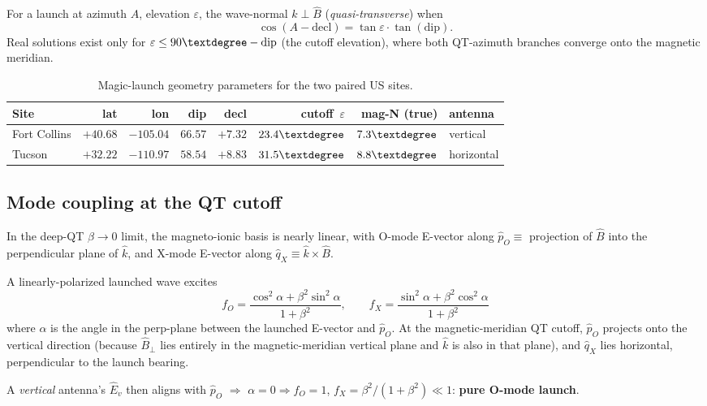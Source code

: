 \documentclass[11pt]{article}
\begin{document}
For a launch at azimuth $A$, elevation $\varepsilon$, the wave-normal
$\hat{k}\!\perp\!\hat{B}$ (\emph{quasi-transverse}) when
\[
   \cos(A - \mathrm{decl}) = \tan\varepsilon\cdot\tan(\mathrm{dip}).
\]
Real solutions exist only for $\varepsilon\le 90\textdegree-\mathrm{dip}$
(the cutoff elevation), where both QT-azimuth branches converge onto
the magnetic meridian.

\begin{table}[H]
\centering
\caption{Magic-launch geometry parameters for the two paired US sites.}
\begin{tabular}{lrrrrrrl}
\toprule
Site            & lat        & lon         & dip   & decl   & cutoff~$\varepsilon$ & mag-N (true) & antenna \\
\midrule
Fort Collins    & $+40.68$   & $-105.04$   & $66.57$ & $+7.32$ & $23.4\textdegree$ & $7.3\textdegree$  & vertical \\
Tucson          & $+32.22$   & $-110.97$   & $58.54$ & $+8.83$ & $31.5\textdegree$ & $8.8\textdegree$  & horizontal \\
\bottomrule
\end{tabular}
\end{table}

\subsection*{Mode coupling at the QT cutoff}

In the deep-QT $\beta\!\to\!0$ limit, the magneto-ionic basis is
nearly linear, with O-mode E-vector along $\hat{p}_O\equiv$ projection
of $\hat{B}$ into the perpendicular plane of $\hat{k}$, and X-mode
E-vector along $\hat{q}_X\equiv\hat{k}\!\times\!\hat{B}$.

A linearly-polarized launched wave excites
\[
   f_O = \frac{\cos^2\alpha + \beta^2\sin^2\alpha}{1+\beta^2}, \qquad
   f_X = \frac{\sin^2\alpha + \beta^2\cos^2\alpha}{1+\beta^2}
\]
where $\alpha$ is the angle in the perp-plane between the launched
E-vector and $\hat{p}_O$.  At the magnetic-meridian QT cutoff,
$\hat{p}_O$ projects onto the vertical direction (because $\hat{B}_\perp$
lies entirely in the magnetic-meridian vertical plane and $\hat{k}$
is also in that plane), and $\hat{q}_X$ lies horizontal,
perpendicular to the launch bearing.

A \emph{vertical} antenna's $\hat{E}_v$ then aligns with $\hat{p}_O$
$\Rightarrow$ $\alpha=0\Rightarrow f_O=1$, $f_X=\beta^2/(1+\beta^2)\ll 1$:
\textbf{pure O-mode launch}.
\end{document}
